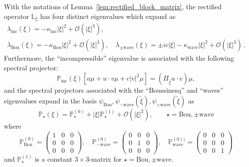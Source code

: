 \documentclass[AHL,Unicode,longabstracts,published]{cedram}
\newcommand{\Wave}{\mathrm{wave}}
\newcommand{\Inc}{\mathrm{inc}}
\newcommand{\Bou}{\mathrm{Bou}}
\newcommand{\rectL}{\mathbb{L}}
\newcommand{\bbP}{\mathbb{P}}
\newcommand{\OO}{\mathcal{O}}
\begin{document}
\newcommand{\rectP}{\bbP}
\begin{lemm}\label{lem:diagonalization_rectified}
With the notations of Lemma~\ref{lem:rectified_block_matrix}, the rectified operator $\rectL_\xi$ has four distinct eigenvalues which expand as
\begin{gather*}
\lambda_\Inc(\xi) = - \kappa_\Inc | \xi |^2 + \OO\left(|\xi|^3 \right), \\
\lambda_\Bou(\xi) = - \kappa_\Bou | \xi |^2 + \OO\left(|\xi|^3 \right), \quad
\lambda_{\pm \Wave}(\xi) = \pm i c | \xi| - \kappa_\Wave |\xi|^2 + \OO\left(|\xi|^3 \right)\,.
\end{gather*}
Furthermore, the ``incompressible'' eigenvalue is associated with the following spectral projector:
\begin{equation*}
\rectP_\Inc\left(\xi \right) \left[a \mu + u \cdot v \mu + c |v|^2 \mu \right] = {\left(\Pi_{\widetilde{\xi}}u\cdot v\right)} \mu,
\end{equation*}
and the spectral projectors associated with the ``Boussinesq'' and ``waves'' eigenvalues expand in the basis $\psi_{\Bou}, \psi_{- \Wave}\left(\widetilde{\xi} \right), \psi_{+ \Wave}\left(\widetilde{\xi} \right)$ as
\begin{equation}\label{eq:textbook_expansion_projector}
\rectP_{\star}(\xi)=\rectP_{\star}^{(0)} + |\xi|\rectP^{(1)}_{\star}+\OO\left(|\xi|^{2}\right), \qquad \star=\Bou,\pm\Wave
\end{equation}
where
\begin{equation}\label{eq:textbook_rectP0}
\rectP_{\Bou}^{(0)}= \left(
\begin{matrix}
1 & 0 & 0 \\ 0 & 0 & 0 \\ 0 & 0 & 0
\end{matrix}\right), \quad \rectP_{-\Wave}^{(0)} = \left(
\begin{matrix}
0 & 0 & 0 \\ 0 & 1 & 0 \\ 0 & 0 & 0
\end{matrix}\right), \quad \rectP_{\Wave}^{(0))} = \left(
\begin{matrix}
0 & 0 & 0 \\ 0 & 0 & 0 \\ 0 & 0 & 1
\end{matrix}\right)
\end{equation}
and $\rectP_{\star}^{(1)}$ is a constant $3\times 3$-matrix for $\star=\Bou,\pm\Wave$.
\end{lemm}
\end{document}
